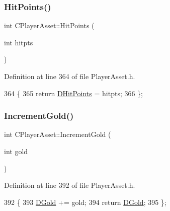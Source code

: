 \subsubsection{\texorpdfstring{Hit\+Points()}{HitPoints()}\hspace{0.1cm}{\footnotesize\ttfamily [2/2]}}
{\footnotesize\ttfamily int C\+Player\+Asset\+::\+Hit\+Points (\begin{DoxyParamCaption}\item[{int}]{hitpts }\end{DoxyParamCaption})\hspace{0.3cm}{\ttfamily [inline]}}



Definition at line 364 of file Player\+Asset.\+h.


\begin{DoxyCode}
364                                  \{
365             \textcolor{keywordflow}{return} \hyperlink{classCPlayerAsset_a331750935bf594e665544085fb74e89d}{DHitPoints} = hitpts;
366         \};
\end{DoxyCode}
\hypertarget{classCPlayerAsset_afe41876166e7a3ad8d3d5465595d3de7}{}\label{classCPlayerAsset_afe41876166e7a3ad8d3d5465595d3de7} 
\subsubsection{\texorpdfstring{Increment\+Gold()}{IncrementGold()}}
{\footnotesize\ttfamily int C\+Player\+Asset\+::\+Increment\+Gold (\begin{DoxyParamCaption}\item[{int}]{gold }\end{DoxyParamCaption})\hspace{0.3cm}{\ttfamily [inline]}}



Definition at line 392 of file Player\+Asset.\+h.


\begin{DoxyCode}
392                                    \{
393             \hyperlink{classCPlayerAsset_ab90ebdc73c6794fd44ddbe273f610292}{DGold} += gold;
394             \textcolor{keywordflow}{return} \hyperlink{classCPlayerAsset_ab90ebdc73c6794fd44ddbe273f610292}{DGold};
395         \};
\end{DoxyCode}
\hypertarget{classCPlayerAsset_a101767304149c0d1c1b0b88cf8e09b36}{}\label{classCPlayerAsset_a101767304149c0d1c1b0b88cf8e09b36} 
